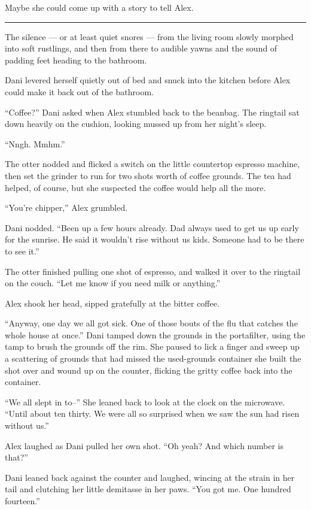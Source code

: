 Maybe she could come up with a story to tell Alex.

\begin{center}\rule{0.5\linewidth}{\linethickness}\end{center}

The silence --- or at least quiet snores --- from the living room slowly morphed into soft rustlings, and then from there to audible yawns and the sound of padding feet heading to the bathroom.

Dani levered herself quietly out of bed and snuck into the kitchen before Alex could make it back out of the bathroom.

``Coffee?'' Dani asked when Alex stumbled back to the beanbag. The ringtail sat down heavily on the cushion, looking mussed up from her night's sleep.

``Nngh. Mmhm.''

The otter nodded and flicked a switch on the little countertop espresso machine, then set the grinder to run for two shots worth of coffee grounds. The tea had helped, of course, but she suspected the coffee would help all the more.

``You're chipper,'' Alex grumbled.

Dani nodded. ``Been up a few hours already. Dad always used to get us up early for the sunrise. He said it wouldn't rise without us kids. Someone had to be there to see it.''

The otter finished pulling one shot of espresso, and walked it over to the ringtail on the couch. ``Let me know if you need milk or anything.''

Alex shook her head, sipped gratefully at the bitter coffee.

``Anyway, one day we all got sick. One of those bouts of the flu that catches the whole house at once.'' Dani tamped down the grounds in the portafilter, using the tamp to brush the grounds off the rim. She paused to lick a finger and sweep up a scattering of grounds that had missed the used-grounds container she built the shot over and wound up on the counter, flicking the gritty coffee back into the container.

``We all slept in to--'' She leaned back to look at the clock on the microwave. ``Until about ten thirty. We were all so surprised when we saw the sun had risen without us.''

Alex laughed as Dani pulled her own shot. ``Oh yeah? And which number is that?''

Dani leaned back against the counter and laughed, wincing at the strain in her tail and clutching her little demitasse in her paws. ``You got me. One hundred fourteen.''

